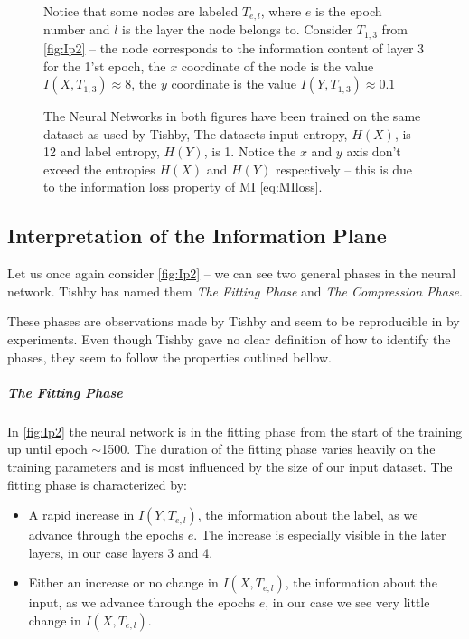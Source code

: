 \documentclass[dissertation.tex]{subfiles}
\begin{document}
\begin{figure}[H]
{    Notice that some nodes are labeled $T_{e,l}$, where $e$ is the epoch number
    and $l$ is the layer the node belongs to. Consider $T_{1,3}$ from
    \autoref{fig:Ip2} -- the node corresponds to the information content of
    layer 3 for the 1'st epoch, the $x$ coordinate of the node is the value
    $I(X, T_{1,3})\approx{8}$, the $y$ coordinate is the value $I(Y,
    T_{1,3})\approx{0.1}$
   
    The Neural Networks in both figures have been trained on the same dataset as
    used by Tishby\cite{TISHBY}, The datasets input entropy, $H(X)$, is 12 and
    label entropy, $H(Y)$, is 1. Notice the $x$ and $y$ axis don't exceed the
    entropies $H(X)$ and $H(Y)$ respectively -- this is due to the information
    loss property of MI \autoref{eq:MIloss}.
  }
\end{figure}

\subsection{Interpretation of the Information Plane} \label{subIotIP}

Let us once again consider \autoref{fig:Ip2} -- we can see two general phases in
the neural network. Tishby has named them \emph{The Fitting Phase} and \emph{The
Compression Phase}. 

These phases are observations made by Tishby and seem to be reproducible in by
experiments. Even though Tishby gave no clear definition of how to identify the
phases, they seem to follow the properties outlined bellow.

\subparagraph{The Fitting Phase} In \autoref{fig:Ip2} the neural network is in
the fitting phase from the start of the training up until epoch $\sim$1500. The
duration of the fitting phase varies heavily on the training parameters and is
most influenced by the size of our input dataset. The fitting phase is
characterized by:
\begin{itemize}
  \item{
      A rapid increase in $I(Y, T_{e,l})$, the information about the label, as
      we advance through the epochs $e$. The increase is especially visible in
      the later layers, in our case layers 3 and 4.
    }
  \item{
      Either an increase or no change in $I(X, T_{e,l})$, the information about
      the input, as we advance through the epochs $e$, in our case we see very
      little change in $I(X,T_{e,l})$.
    }
\end{itemize}
\end{document}
